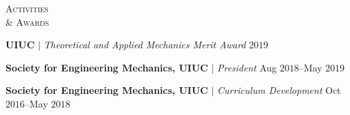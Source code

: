 \documentclass[10pt]{article}
\begin{document}
\vspace{-1.5em}
\begin{multicols}{2}
\textsc{Activities\\ \& Awards}
\columnbreak

\textbf{UIUC} $|$ \textit{Theoretical and Applied Mechanics Merit Award} \hfill $2019$

\vspace{-0.75em}

\textbf{Society for Engineering Mechanics, UIUC} $|$ \textit{President} \hfill Aug $2018$--May $2019$

\vspace{-0.75em}

%
\textbf{Society for Engineering Mechanics, UIUC} $|$ \textit{Curriculum Development} \hfill Oct $2016$--May $2018$

%
\end{multicols}
\vspace{-1.5em} 
\end{document}
